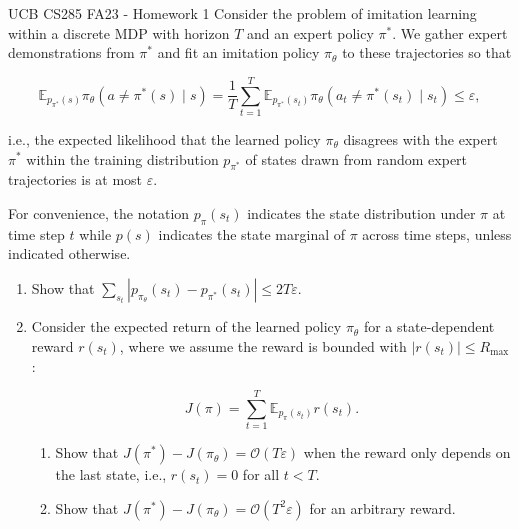 \begin{problem}{}{}{UCB CS285 FA23 - Homework 1}
Consider the problem of imitation learning within a discrete MDP with
horizon $T$ and an expert policy $\pi^*$. We gather expert demonstrations
from $\pi^*$ and fit an imitation policy $\pi_\theta$ to these trajectories so that

$$ \mathbb{E}_{p_{\pi^*}(s)} \pi_\theta(a \neq \pi^*(s) \mid s)
    = \frac{1}{T} \sum_{t=1}^T \mathbb{E}_{p_{\pi^*}(s_t)} \pi_\theta(a_t \neq \pi^*(s_t) \mid s_t) \leq \varepsilon, $$

i.e., the expected likelihood that the learned policy $\pi_\theta$ disagrees
with the expert $\pi^*$ within the training distribution $p_{\pi^*}$ of states
drawn from random expert trajectories is at most $\varepsilon$.

For convenience, the notation $p_\pi(s_t)$ indicates the state distribution
under $\pi$ at time step $t$ while $p(s)$ indicates the state marginal of
$\pi$ across time steps, unless indicated otherwise.

\begin{enumerate}
    \item Show that $\sum_{s_t} |p_{\pi_\theta}(s_t) - p_{\pi^*}(s_t)| \leq 2T\varepsilon$.
    \item Consider the expected return of the learned policy $\pi_\theta$ for a
          state-dependent reward $r(s_t)$, where we assume the reward is bounded
          with $|r(s_t)| \leq R_{\text{max}}$:

          $$ J(\pi) = \sum_{t=1}^T \mathbb{E}_{p_{\pi}(s_t)} r(s_t). $$

          \begin{enumerate}
              \item[(a)] Show that $J(\pi^*) - J(\pi_\theta) = \mathcal{O}(T\varepsilon)$
                    when the reward only depends on the last state, i.e., $r(s_t) = 0$
                    for all $t < T$.

              \item[(b)] Show that $J(\pi^*) - J(\pi_\theta) = \mathcal{O}(T^2\varepsilon)$
                    for an arbitrary reward.
          \end{enumerate}
\end{enumerate}
\end{problem}

